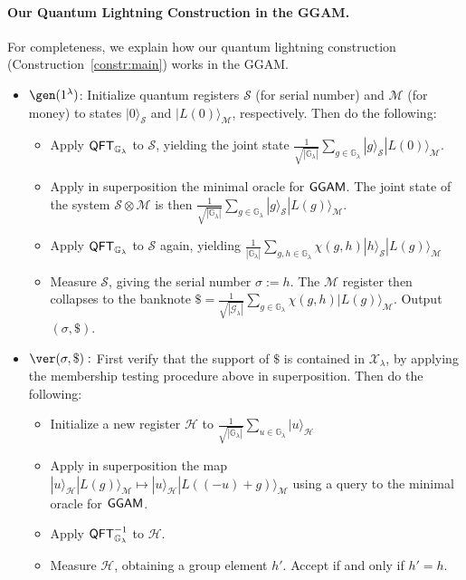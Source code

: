 \documentclass{article}\usepackage[a4paper,margin=20mm]{geometry}
\numberwithin{theorem}{section}
\numberwithin{equation}{section}
\newcommand{\G}{\mathbb{G}}
\newcommand{\Gs}{{\mathcal{G}}}
\newcommand{\Hs}{{\mathcal{H}}}
\newcommand{\Ms}{{\mathcal{M}}}
\newcommand{\Ss}{{\mathcal{S}}}
\newcommand{\Xs}{{\mathcal{X}}}
\newcommand{\QFT}{{\sf QFT}}
\newcommand{\GGAM}{{\sf GGAM}}
\begin{document}
\paragraph{Our Quantum Lightning Construction in the GGAM.} For completeness, we explain how our quantum lightning construction (Construction~\ref{constr:main}) works in the GGAM.
\begin{itemize}
	\item $\gen(1^\lambda)$: Initialize quantum registers $\Ss$ (for serial number) and $\Ms$ (for money) to states $|0\rangle_\Ss$ and $|L(0)\rangle_\Ms$, respectively. Then do the following:
	\begin{itemize}
		\item Apply $\QFT_{\G_\lambda}$ to $\Ss$, yielding the joint state $\frac{1}{\sqrt{|\G_\lambda|}}\sum_{g\in\G_\lambda}|g\rangle_\Ss|L(0)\rangle_\Ms$.
		\item Apply in superposition the minimal oracle for $\GGAM$. The joint state of the system $\Ss\otimes\Ms$ is then $\frac{1}{\sqrt{|\G_\lambda|}}\sum_{g\in\G_\lambda}|g\rangle_\Ss|L(g)\rangle_\Ms$.
		\item Apply $\QFT_{\G_\lambda}$ to $\Ss$ again, yielding $\frac{1}{|\G_\lambda|}\sum_{g,h\in\G_\lambda}\chi(g,h)|h\rangle_\Ss|L(g)\rangle_\Ms$
		\item Measure $\Ss$, giving the serial number $\sigma:=h$. The $\Ms$ register then collapses to the banknote $\$=\frac{1}{\sqrt{|\Gs_\lambda|}}\sum_{g\in\G_\lambda}\chi(g,h)|L(g)\rangle_\Ms$. Output $(\sigma,\$)$. 
	\end{itemize}
	\item $\ver(\sigma,\$):$ First verify that the support of $\$$ is contained in $\Xs_\lambda$, by applying the membership testing procedure above in superposition. Then do the following:
	\begin{itemize}
		\item Initialize a new register $\Hs$ to $\frac{1}{\sqrt{|\G_\lambda|}}\sum_{u\in\G_\lambda}|u\rangle_\Hs$
		\item Apply in superposition the map $|u\rangle_\Hs|L(g)\rangle_\Ms\mapsto |u\rangle_\Hs|L((-u)+g)\rangle_\Ms$ using a query to the minimal oracle for $\GGAM$.
		\item Apply $\QFT^{-1}_{\G_\lambda}$ to $\Hs$.
		\item Measure $\Hs$, obtaining a group element $h'$. Accept if and only if $h'=h$.
	\end{itemize}
\end{itemize}
\end{document}
